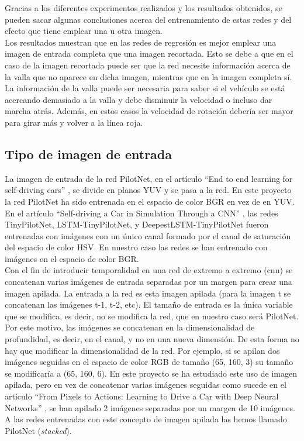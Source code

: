 Gracias a los diferentes experimentos realizados y los resultados obtenidos, se pueden sacar algunas conclusiones acerca del entrenamiento de estas redes y del efecto que tiene emplear una u otra imagen.\\


Los resultados muestran que en las redes de regresión es mejor emplear una imagen de entrada completa que una imagen recortada. Esto se debe a que en el caso de la imagen recortada puede ser que la red necesite información acerca de la valla que no aparece en dicha imagen, mientras que en la imagen completa sí. La información de la valla puede ser necesaria para saber si el vehículo se está acercando demasiado a la valla y debe disminuir la velocidad o incluso dar marcha atrás. Además, en estos casos la velocidad de rotación debería ser mayor para girar más y volver a la línea roja.\\





\subsection{Tipo de imagen de entrada}

La imagen de entrada de la red PilotNet, en el artículo ``End to end learning for self-driving cars'' \cite{end2end}, se divide en planos YUV y se pasa a la red. En este proyecto la red PilotNet ha sido entrenada en el espacio de color BGR en vez de en YUV.\\

En el artículo ``Self-driving a Car in Simulation Through a CNN'' \cite{self-driving}, las redes TinyPilotNet, LSTM-TinyPilotNet, y DeepestLSTM-TinyPilotNet fueron entrenadas con imágenes con un único canal formado por el canal de saturación del espacio de color HSV. En nuestro caso las redes se han entrenado con imágenes en el espacio de color BGR.\\

Con el fin de introducir temporalidad en una red de extremo a extremo (\acrshort{cnn}) se concatenan varias imágenes de entrada separadas por un margen para crear una imagen apilada. La entrada a la red es esta imagen apilada (para la imagen t se concatenan las imágenes t-1, t-2, etc). El tamaño de entrada es la única variable que se modifica, es decir, no se modifica la red, que en nuestro caso será PilotNet. Por este motivo, las imágenes se concatenan en la dimensionalidad de profundidad, es decir, en el canal, y no en una nueva dimensión. De esta forma no hay que modificar la dimensionalidad de la red. Por ejemplo, si se apilan dos imágenes seguidas en el espacio de color RGB de tamaño (65, 160, 3) su tamaño se modificaría a (65, 160, 6). En este proyecto se ha estudiado este uso de imagen apilada, pero en vez de concatenar varias imágenes seguidas como sucede en el artículo ``From Pixels to Actions: Learning to Drive a Car with Deep Neural Networks'' \cite{pixels}, se han apilado 2 imágenes separadas por un margen de 10 imágenes. A las redes entrenadas con este concepto de imagen apilada las hemos llamado PilotNet (\textit{stacked}).\\

